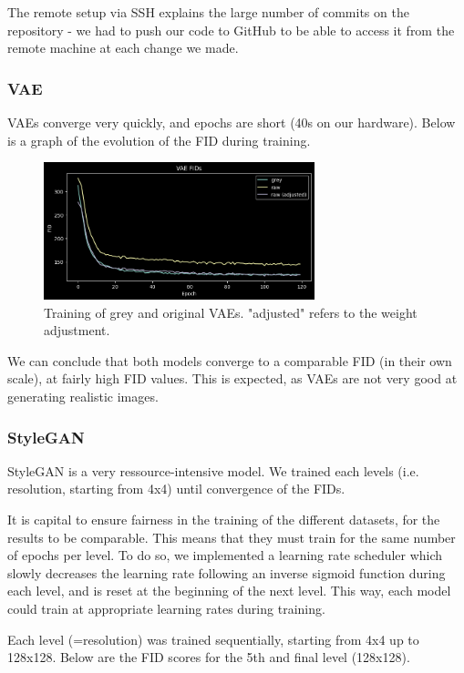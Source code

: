 \documentclass{article}
\begin{document}
The remote setup via SSH explains the large number of commits on the repository - we had to push our code to GitHub to be able to access it from the remote machine at each change we made.

\subsubsection*{VAE}

VAEs converge very quickly, and epochs are short (40s on our hardware). Below is a graph of the evolution of the FID during training.

\begin{figure}[H]
    \centering
    \includegraphics[width=0.7\textwidth]{images/vae_fids.png}
    \caption{Training of grey and original VAEs. "adjusted" refers to the weight adjustment.}
\end{figure}

We can conclude that both models converge to a comparable FID (in their own scale), at fairly high FID values. This is expected, as VAEs are not very good at generating realistic images. 

\subsubsection*{StyleGAN}
StyleGAN is a very ressource-intensive model. 
We trained each levels (i.e. resolution, starting from 4x4) until convergence of the FIDs. 

It is capital to ensure fairness in the training of the different datasets, for the results to be comparable. This means that they must train for the same number of epochs per level. To do so, we implemented a learning rate scheduler which slowly decreases the learning rate following an inverse sigmoid function during each level, and is reset at the beginning of the next level. This way, each model could train at appropriate learning rates during training.

Each level (=resolution) was trained sequentially, starting from 4x4 up to 128x128. Below are the FID scores for the 5th and final level (128x128).
\end{document}
